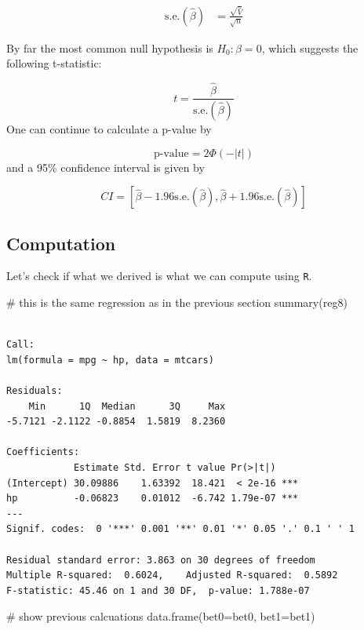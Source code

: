 \documentclass[
  letterpaper,
  DIV=11,
  numbers=noendperiod]{scrreprt}
\newenvironment{Shaded}{\begin{snugshade}}{\end{snugshade}}
\newcommand{\AttributeTok}[1]{\textcolor[rgb]{0.40,0.45,0.13}{#1}}
\newcommand{\CommentTok}[1]{\textcolor[rgb]{0.37,0.37,0.37}{#1}}
\newcommand{\FunctionTok}[1]{\textcolor[rgb]{0.28,0.35,0.67}{#1}}
\newcommand{\NormalTok}[1]{\textcolor[rgb]{0.00,0.23,0.31}{#1}}
\begin{document}
\[
\begin{aligned}
  \textrm{s.e.}(\hat{\beta}) &= \frac{\sqrt{\hat{V}}}{\sqrt{n}}
\end{aligned}
\]

By far the most common null hypothesis is \(H_0: \beta = 0\), which
suggests the following t-statistic:

\[
  t = \frac{\hat{\beta}}{\textrm{s.e.}(\hat{\beta})}
\] One can continue to calculate a p-value by

\[
  \textrm{p-value} = 2 \Phi(-|t|)
\] and a 95\% confidence interval is given by

\[
  CI = [\hat{\beta} - 1.96 \textrm{s.e.}(\hat{\beta}), \hat{\beta} + 1.96 \textrm{s.e.}(\hat{\beta})]
\]

\subsection{Computation}\label{computation-8}

Let's check if what we derived is what we can compute using \texttt{R}.

\begin{Shaded}
\begin{Highlighting}[]
\CommentTok{\# this is the same regression as in the previous section}
\FunctionTok{summary}\NormalTok{(reg8)}
\end{Highlighting}
\end{Shaded}

\begin{verbatim}

Call:
lm(formula = mpg ~ hp, data = mtcars)

Residuals:
    Min      1Q  Median      3Q     Max 
-5.7121 -2.1122 -0.8854  1.5819  8.2360 

Coefficients:
            Estimate Std. Error t value Pr(>|t|)    
(Intercept) 30.09886    1.63392  18.421  < 2e-16 ***
hp          -0.06823    0.01012  -6.742 1.79e-07 ***
---
Signif. codes:  0 '***' 0.001 '**' 0.01 '*' 0.05 '.' 0.1 ' ' 1

Residual standard error: 3.863 on 30 degrees of freedom
Multiple R-squared:  0.6024,    Adjusted R-squared:  0.5892 
F-statistic: 45.46 on 1 and 30 DF,  p-value: 1.788e-07
\end{verbatim}

\begin{Shaded}
\begin{Highlighting}[]
\CommentTok{\# show previous calcuations}
\FunctionTok{data.frame}\NormalTok{(}\AttributeTok{bet0=}\NormalTok{bet0, }\AttributeTok{bet1=}\NormalTok{bet1)}
\end{Highlighting}
\end{Shaded}
\end{document}
